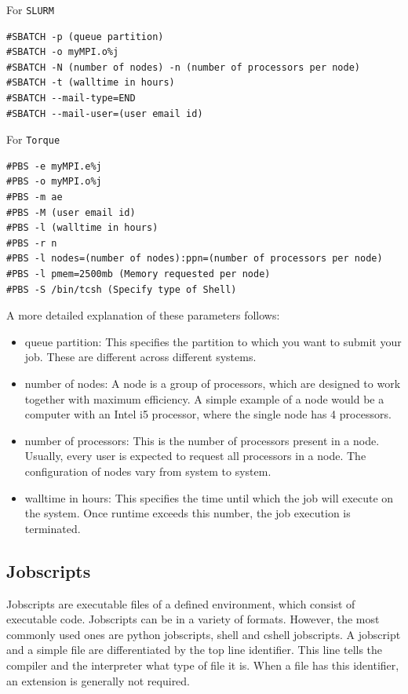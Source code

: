 \documentclass[11pt]{article}
\begin{document}
For \texttt{SLURM}
\begin{verbatim}
#SBATCH -p (queue partition)
#SBATCH -o myMPI.o%j
#SBATCH -N (number of nodes) -n (number of processors per node)
#SBATCH -t (walltime in hours)
#SBATCH --mail-type=END
#SBATCH --mail-user=(user email id)
\end{verbatim}

For \texttt{Torque}
\begin{verbatim}
#PBS -e myMPI.e%j
#PBS -o myMPI.o%j
#PBS -m ae
#PBS -M (user email id)	
#PBS -l (walltime in hours)
#PBS -r n
#PBS -l nodes=(number of nodes):ppn=(number of processors per node)
#PBS -l pmem=2500mb (Memory requested per node)
#PBS -S /bin/tcsh (Specify type of Shell)
\end{verbatim}

A more detailed explanation of these parameters follows:
\begin{itemize}
\item queue partition: This specifies the partition to which you want to submit your job. These are different across different systems.
\item number of nodes: A node is a group of processors, which are designed to work together with maximum efficiency. A simple example of a node would be a computer with an Intel i5 processor, where the single node has 4 processors.
\item number of processors: This is the number of processors present in a node. Usually, every user is expected to request all processors in a node. The configuration of nodes vary from system to system.
\item walltime in hours: This specifies the time until which the job will execute on the system. Once runtime exceeds this number, the job execution is terminated.
\end{itemize}

\subsection{Jobscripts}
\label{sec-3-2}
Jobscripts are executable files of a defined environment, which consist of executable code. Jobscripts can be in a variety of formats. However, the most commonly used ones are python jobscripts, shell and cshell jobscripts.
A jobscript and a simple file are differentiated by the top line identifier. This line tells the compiler and the interpreter what type of file it is. When a file has this identifier, an extension is generally not required. 
\end{document}
